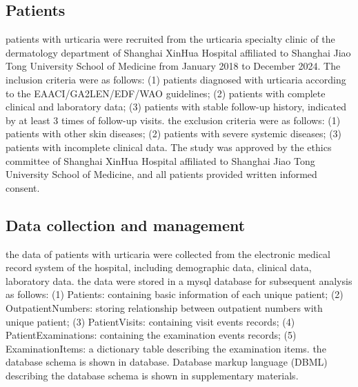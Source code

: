 \documentclass[final,1p,times,authoryear]{elsarticle}
\begin{document}
\subsection{Patients}\label{Patients}

patients with urticaria were recruited from the urticaria specialty clinic of the dermatology department of Shanghai XinHua Hospital affiliated to Shanghai Jiao Tong University School of Medicine from January 2018 to December 2024. The inclusion criteria were as follows: (1) patients diagnosed with urticaria according to the EAACI/GA2LEN/EDF/WAO guidelines\citep{Zuberbier2021The}; (2) patients with complete clinical and laboratory data; (3) patients with stable follow-up history, indicated by at least 3 times of follow-up visits. the exclusion criteria were as follows: (1) patients with other skin diseases; (2) patients with severe systemic diseases; (3) patients with incomplete clinical data. The study was approved by the ethics committee of Shanghai XinHua Hospital affiliated to Shanghai Jiao Tong University School of Medicine, and all patients provided written informed consent.

\subsection{Data collection and management}\label{Data}

the data of patients with urticaria were collected from the electronic medical record system of the hospital, including demographic data, clinical data, laboratory data. 
the data were stored in a mysql database for subsequent analysis as follows: (1) Patients: containing basic information of each unique patient; (2) OutpatientNumbers: storing relationship between outpatient numbers with unique patient; (3) PatientVisits: containing visit events records; (4) PatientExaminations: containing the examination events records; (5) ExaminationItems: a dictionary table describing the examination items. the database schema is shown in database. Database 
markup language (DBML) describing the database schema is shown in supplementary materials.
\end{document}
